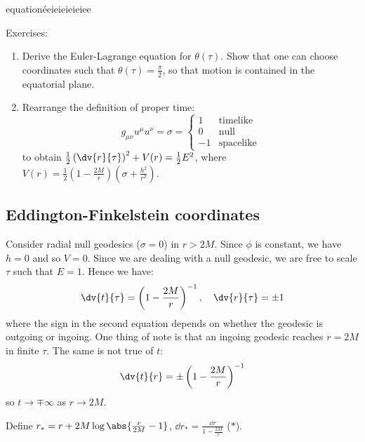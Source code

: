 \documentclass{jknotes}
\begin{document}
equationéeieieieieiee

Exercises:
\begin{enumerate}
    \item Derive the Euler-Lagrange equation for \(\theta(\tau)\). Show that one can choose coordinates such that \(\theta(\tau) = \frac{\pi}{2}\), so that motion is contained in the equatorial plane.
    \item Rearrange the definition of proper time:
        \begin{equation}
            g_{\mu\nu}u^\mu u^\nu = \sigma = 
            \begin{cases}
                1 & \text{timelike}\\
                0 & \text{null}\\
                -1 & \text{spacelike}
            \end{cases}
        \end{equation}
        to obtain \(\frac{1}{2}\left( \dv{r}{\tau} \right)^2 + V(r) = \frac{1}{2}E^2\), where \(V(r) = \frac{1}{2}\left( 1-\frac{2M}{r} \right)\left( \sigma+\frac{h^2}{r^2} \right)\).
\end{enumerate}

\subsection{Eddington-Finkelstein coordinates}
Consider radial null geodesics (\(\sigma=0\)) in \(r>2M\). Since \(\phi\) is constant, we have \(h=0\) and so \(V=0\). Since we are dealing with a null geodesic, we are free to scale \(\tau\) such that \(E=1\). Hence we have:
\begin{equation}
    \dv{t}{\tau} = \left( 1-\frac{2M}{r} \right)^{-1}
    ,\quad
    \dv{r}{\tau} = \pm 1
\end{equation}
where the sign in the second equation depends on whether the geodesic is outgoing or ingoing. One thing of note is that an ingoing geodesic reaches \(r=2M\) in finite \(\tau\). The same is not true of \(t\):
\begin{equation}
    \dv{t}{r} = \pm\left( 1-\frac{2M}{r} \right)^{-1}
\end{equation}
so \(t\rightarrow\mp\infty\) as \(r\rightarrow2M\).

Define \(r_*=r+2M\log\abs{\frac{r}{2M}-1}\), \(\dd{r_*} = \frac{\dd{r}}{1 - \frac{2M}{r}}\) (\(*\)).
\end{document}
